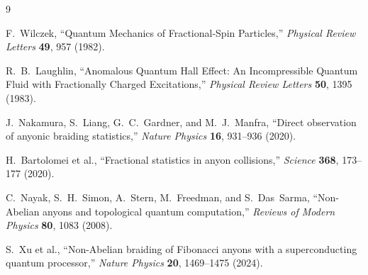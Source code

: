 \documentclass[11pt,a4paper]{article}
\begin{document}
\begin{thebibliography}{9}

F.~Wilczek, ``Quantum Mechanics of Fractional-Spin Particles,''
\emph{Physical Review Letters} \textbf{49}, 957 (1982).

R.~B.~Laughlin, ``Anomalous Quantum Hall Effect: An Incompressible Quantum
Fluid with Fractionally Charged Excitations,''
\emph{Physical Review Letters} \textbf{50}, 1395 (1983).

J.~Nakamura, S.~Liang, G.~C.~Gardner, and M.~J.~Manfra,
``Direct observation of anyonic braiding statistics,''
\emph{Nature Physics} \textbf{16}, 931--936 (2020).

H.~Bartolomei et al.,
``Fractional statistics in anyon collisions,''
\emph{Science} \textbf{368}, 173--177 (2020).

C.~Nayak, S.~H.~Simon, A.~Stern, M.~Freedman, and S.~Das~Sarma,
``Non-Abelian anyons and topological quantum computation,''
\emph{Reviews of Modern Physics} \textbf{80}, 1083 (2008).

S.~Xu et al.,
``Non-Abelian braiding of Fibonacci anyons with a superconducting quantum
processor,''
\emph{Nature Physics} \textbf{20}, 1469--1475 (2024).

\end{thebibliography}
\end{document}
